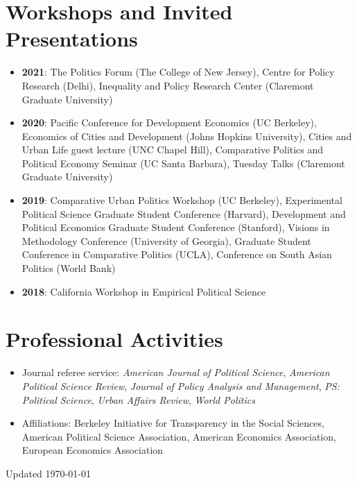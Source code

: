 \documentclass[11pt]{article}
\begin{document}
\section*{Workshops and Invited Presentations}
\color{Black}
\begin{itemize}
\item[] \textbf{2021}: The Politics Forum (The College of New Jersey), Centre for Policy Research (Delhi), Inequality and Policy Research Center (Claremont Graduate University)
\item[] \textbf{2020}: Pacific Conference for Development Economics (UC Berkeley), Economics of Cities and Development (Johns Hopkins University), Cities and Urban Life guest lecture (UNC Chapel Hill), Comparative Politics and Political Economy Seminar (UC Santa Barbara), Tuesday Talks (Claremont Graduate University)
\item[] \textbf{2019}: Comparative Urban Politics Workshop (UC Berkeley), Experimental Political Science Graduate Student Conference (Harvard), Development and Political Economics Graduate Student Conference (Stanford), Visions in Methodology Conference (University of Georgia), Graduate Student Conference in Comparative Politics (UCLA), Conference on South Asian Politics (World Bank)
\item[] \textbf{2018}: California Workshop in Empirical Political Science
\end{itemize}

\vspace{2mm}

\color{MidnightBlue}

\section*{Professional Activities}
\color{Black}

\begin{itemize}	

\item[]Journal referee service: \textit{American Journal of Political Science}, \textit{American Political Science Review}, \textit{Journal of Policy Analysis and Management}, \textit{PS: Political Science}, \textit{Urban Affairs Review}, \textit{World Politics}\item[]Affiliations: Berkeley Initiative for Transparency in the Social Sciences, American Political Science Association,  American Economics Association, European Economics Association
\end{itemize}


\vspace*{\fill}

\flushright Updated \today
\end{document}
